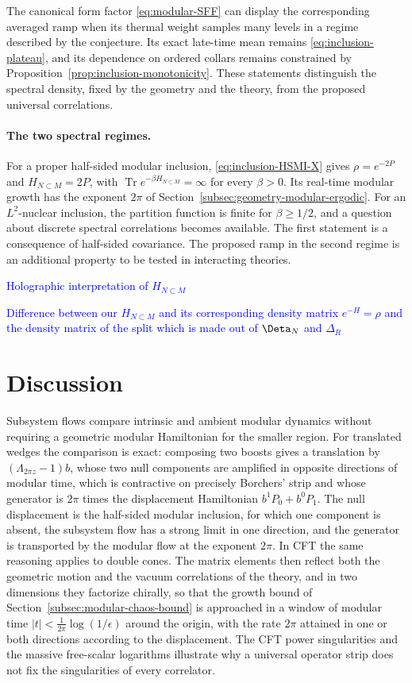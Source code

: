 \documentclass[a4paper,11pt]{article}
\theoremstyle{definition}
\newcommand{\NL}[1]{\textcolor{blue}{#1}}
\begin{document}
The canonical form factor \eqref{eq:modular-SFF} can display the corresponding averaged ramp when its thermal weight samples many levels in a regime described by the conjecture. Its exact late-time mean remains \eqref{eq:inclusion-plateau}, and its dependence on ordered collars remains constrained by Proposition~\ref{prop:inclusion-monotonicity}. These statements distinguish the spectral density, fixed by the geometry and the theory, from the proposed universal correlations.

\paragraph{The two spectral regimes.}
For a proper half-sided modular inclusion, \eqref{eq:inclusion-HSMI-X} gives $\rho=e^{-2P}$ and $H_{N\subset M}=2P$, with $\operatorname{Tr}e^{-\beta H_{N\subset M}}=\infty$ for every $\beta>0$. Its real-time modular growth has the exponent $2\pi$ of Section~\ref{subsec:geometry-modular-ergodic}. For an $L^2$-nuclear inclusion, the partition function is finite for $\beta\ge1/2$, and a question about discrete spectral correlations becomes available. The first statement is a consequence of half-sided covariance. The proposed ramp in the second regime is an additional property to be tested in interacting theories.


\NL{Holographic interpretation of $H_{N\subset M}$}

\NL{Difference between our $H_{N\subset M}$ and its corresponding density matrix $e^{-H}=\rho$ and the density matrix of the split which is made out of $\Deta_N$ and $\Delta_R$}

\section{Discussion}\label{sec:discussion}

Subsystem flows compare intrinsic and ambient modular dynamics without requiring a geometric modular Hamiltonian for the smaller region. For translated wedges the comparison is exact: composing two boosts gives a translation by $(\Lambda_{2\pi z}-1)b$, whose two null components are amplified in opposite directions of modular time, which is contractive on precisely Borchers' strip and whose generator is $2\pi$ times the displacement Hamiltonian $b^1P_0+b^0P_1$. The null displacement is the half-sided modular inclusion, for which one component is absent, the subsystem flow has a strong limit in one direction, and the generator is transported by the modular flow at the exponent $2\pi$. In CFT the same reasoning applies to double cones. The matrix elements then reflect both the geometric motion and the vacuum correlations of the theory, and in two dimensions they factorize chirally, so that the growth bound of Section~\ref{subsec:modular-chaos-bound} is approached in a window of modular time $|t|<\tfrac1{2\pi}\log(1/\epsilon)$ around the origin, with the rate $2\pi$ attained in one or both directions according to the displacement. The CFT power singularities and the massive free-scalar logarithms illustrate why a universal operator strip does not fix the singularities of every correlator.
\end{document}
